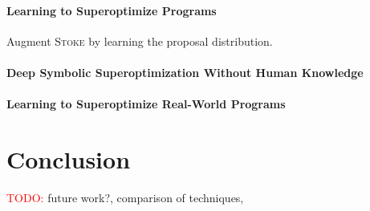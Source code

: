\documentclass[12pt,twoside]{reedthesis}
\newcommand{\red}[1]{\textcolor{red}{#1}}
\begin{document}
\subsubsection{Learning to Superoptimize Programs}
\cite{bunel2017learning}
Augment \textsc{Stoke} by learning the proposal distribution.

\subsubsection{Deep Symbolic Superoptimization Without Human Knowledge}
\cite{hui2020deep}

\subsubsection{Learning to Superoptimize Real-World Programs}
\cite{shypula2022learning}

\chapter{Conclusion}

\red{TODO:} future work?, comparison of techniques, 



\backmatter


\end{document}
